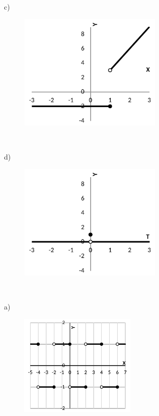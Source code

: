 \begin{respostas}{5}
	c)

	\begin{figure}[H]
		\begin{Center}
			\includegraphics[width=2.71in,height=2.2in]{capitulos/outras_funcoes/media/image72.pdf}
		\end{Center}
	\end{figure}

~~

	d)

	\begin{figure}[H]
		\begin{Center}
			\includegraphics[width=2.71in,height=2.2in]{capitulos/outras_funcoes/media/image73.pdf}
		\end{Center}
	\end{figure}

~~

	\ansitem{} a)

	\begin{figure}[H]
		\begin{Center}
			\includegraphics[width=2.2in,height=1.92in]{capitulos/outras_funcoes/media/image74.pdf}
		\end{Center}
	\end{figure}


\end{respostas}
